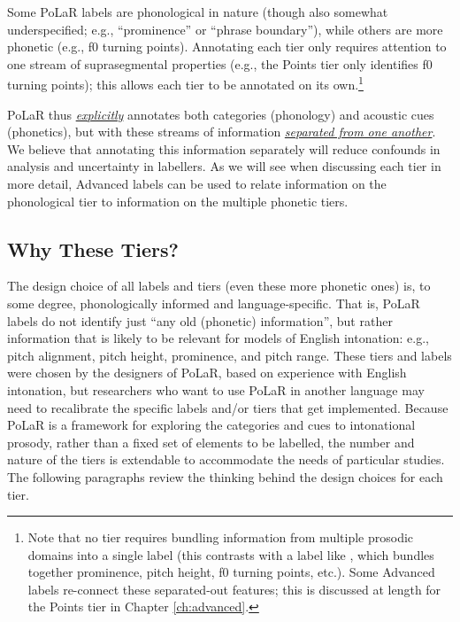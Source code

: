 \documentclass[11pt, twoside]{memoir}
\def\textlabel#1{{\relsize{-.5}\fontspec[Mapping=tex-text]{Roboto Mono}{#1}}}
\begin{document}
Some PoLaR labels are phonological in nature (though also somewhat underspecified; e.g., “prominence” or “phrase boundary”), while others are more phonetic (e.g., f0 turning points). Annotating each tier only requires attention to one stream of suprasegmental properties (e.g., the Points tier only identifies f0 turning points); this allows each tier to be annotated on its own.\footnote{Note that no tier requires bundling information from multiple prosodic domains into a single label (this contrasts with a label like \textlabel{H*}, which bundles together prominence, pitch height, f0 turning points, etc.). Some Advanced labels re-connect these separated-out features; this is discussed at length for the Points tier in Chapter \ref{ch:advanced}.\label{fn:no bundling}}

PoLaR thus \textit{\uline{explicitly}} annotates both categories (phonology) and acoustic cues (phonetics), but with these streams of information \textit{\uline{separated from one another}}. We believe that annotating this information separately will reduce confounds in analysis and uncertainty in labellers. As we will see when discussing each tier in more detail, Advanced labels can be used to relate information on the phonological tier to information on the multiple phonetic tiers.

\subsection{Why These Tiers?}\label{sec:why-these-tiers}

The design choice of all labels and tiers (even these more phonetic ones) is, to some degree, phonologically informed and language-specific. That is, PoLaR labels do not identify just “any old (phonetic) information”, but rather information that is likely to be relevant for models of English intonation: e.g., pitch alignment, pitch height, prominence, and pitch range. These tiers and labels were chosen by the designers of PoLaR, based on experience with English intonation, but researchers who want to use PoLaR in another language may need to recalibrate the specific labels and/or tiers that get implemented. Because PoLaR is a framework for exploring the categories and cues to intonational prosody, rather than a fixed set of elements to be labelled, the number and nature of the tiers is extendable to accommodate the needs of particular studies. The following paragraphs review the thinking behind the design choices for each tier.
\end{document}
